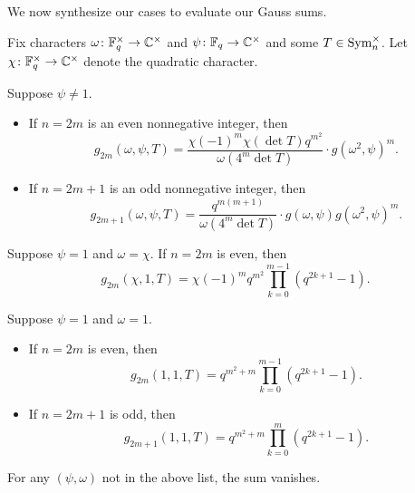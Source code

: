 We now synthesize our cases to evaluate our Gauss sums.
\begin{theorem} \label{thm:gsum-sym}
    Fix characters $\omega\colon\mathbb F_q^\times\to\mathbb C^\times$ and $\psi\colon\mathbb F_q\to\mathbb C^\times$ and some $T\in\operatorname{Sym}_n^\times$. Let $\chi\colon\mathbb F_q^\times\to\mathbb C^\times$ denote the quadratic character.
    \begin{listalph}
        \item Suppose $\psi\ne1$.
        \begin{itemize}
            \item If $n=2m$ is an even nonnegative integer, then
            \[g_{2m}(\omega,\psi,T)=\frac{\chi(-1)^m\chi(\det T)q^{m^2}}{\omega(4^m\det T)}\cdot g\left(\omega^2,\psi\right)^m.\]
            \item If $n=2m+1$ is an odd nonnegative integer, then
            \[g_{2m+1}(\omega,\psi,T)=\frac{q^{m(m+1)}}{\omega(4^m\det T)}\cdot g(\omega,\psi)g\left(\omega^2,\psi\right)^m.\]
        \end{itemize}
        \item Suppose $\psi=1$ and $\omega=\chi$. If $n=2m$ is even, then
        \[g_{2m}(\chi,1,T)=\chi(-1)^mq^{m^2}\prod_{k=0}^{m-1}\left(q^{2k+1}-1\right).\]
        \item Suppose $\psi=1$ and $\omega=1$.
        \begin{itemize}
            \item If $n=2m$ is even, then
            \[g_{2m}(1,1,T)=q^{m^2+m}\prod_{k=0}^{m-1}\left(q^{2k+1}-1\right).\]
            \item If $n=2m+1$ is odd, then
            \[g_{2m+1}(1,1,T)=q^{m^2+m}\prod_{k=0}^{m}\left(q^{2k+1}-1\right).\]
        \end{itemize}
    \end{listalph}
    For any $(\psi,\omega)$ not in the above list, the sum vanishes.
\end{theorem}
